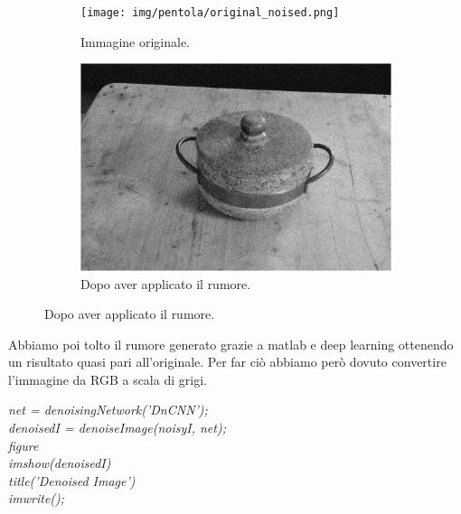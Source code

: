 \documentclass[12pt]{report}
\begin{document}
\begin{figure}[H]
  \centering
  \begin{subfigure}[b]{0.45\linewidth}
    \centering
    \texttt{[image: img/pentola/original\_noised.png]}
    \caption{Immagine originale.}
  \end{subfigure}
  \begin{subfigure}[b]{0.45\linewidth}
    \centering
    \includegraphics[width=\linewidth]{img/pentola/noised_image.png}
    \caption{Dopo aver applicato il rumore.}
  \end{subfigure}
\end{figure}

Abbiamo poi tolto il rumore generato grazie a matlab e deep learning ottenendo un risultato quasi pari all'originale. Per far ci\`o abbiamo però dovuto convertire l'immagine da RGB a scala di grigi.

\textit{net = denoisingNetwork('DnCNN');\\denoisedI = denoiseImage(noisyI, net);\\figure\\imshow(denoisedI)\\title('Denoised Image')\\imwrite();}
\end{document}

